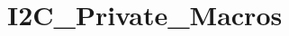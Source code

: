 \hypertarget{group___i2_c___private___macros}{\section{I2\-C\-\_\-\-Private\-\_\-\-Macros}
\label{group___i2_c___private___macros}
}

